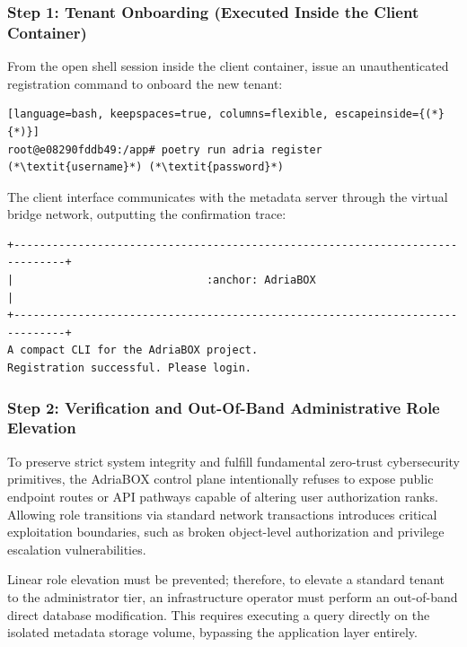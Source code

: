 \subsubsection{Step 1: Tenant Onboarding (Executed Inside the Client Container)}
From the open shell session inside the client container, issue an unauthenticated registration command to onboard the new tenant:
\begin{lstlisting}[language=bash, keepspaces=true, columns=flexible, escapeinside={(*}{*)}]
root@e08290fddb49:/app# poetry run adria register (*\textit{username}*) (*\textit{password}*)
\end{lstlisting}
The client interface communicates with the metadata server through the virtual bridge network, outputting the confirmation trace:
\begin{lstlisting}[basicstyle=\small\ttfamily, frame=single, keepspaces=true, columns=flexible]
+------------------------------------------------------------------------------+
|                              :anchor: AdriaBOX                               |
+------------------------------------------------------------------------------+
A compact CLI for the AdriaBOX project.                                         
Registration successful. Please login.
\end{lstlisting}

\subsubsection{Step 2: Verification and Out-Of-Band Administrative Role Elevation}
To preserve strict system integrity and fulfill fundamental zero-trust cybersecurity primitives, the AdriaBOX control plane intentionally refuses to expose public endpoint routes or API pathways capable of altering user authorization ranks. Allowing role transitions via standard network transactions introduces critical exploitation boundaries, such as broken object-level authorization and privilege escalation vulnerabilities.

Linear role elevation must be prevented; therefore, to elevate a standard tenant to the administrator tier, an infrastructure operator must perform an out-of-band direct database modification. This requires executing a query directly on the isolated metadata storage volume, bypassing the application layer entirely.

